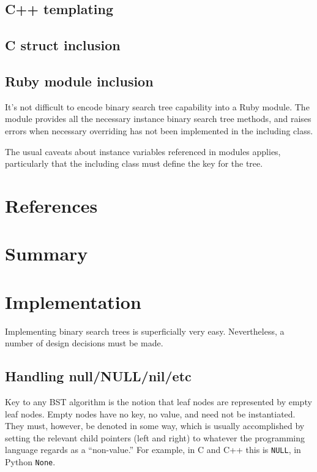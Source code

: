 \documentclass{article}
\begin{document}
\subsection{C++ templating}

\subsection{C struct inclusion}

\subsection{Ruby module inclusion}

It's not difficult to encode binary search tree capability into a Ruby module.
The module provides all the necessary instance binary search tree methods, and
raises errors when necessary overriding has not been implemented in the
including class.

The usual caveats about instance variables referenced in modules applies,
particularly that the including class must define the key for the tree.

\section{References}

{}


\section{Summary}

\appendix

\section{Implementation}

Implementing binary search trees is superficially very easy. Nevertheless,
a number of design decisions must be made.

\subsection{Handling null/NULL/nil/etc}

Key to any BST algorithm is the notion that leaf nodes are represented
by empty leaf nodes. Empty nodes have no key, no value, and need not be
instantiated. They must, however, be denoted in some way, which is
usually accomplished by setting the relevant child pointers (left and
right) to whatever the programming language regards as a ``non-value.''
For example, in C and C++ this is {\tt NULL}, in Python {\tt None}.
\end{document}
